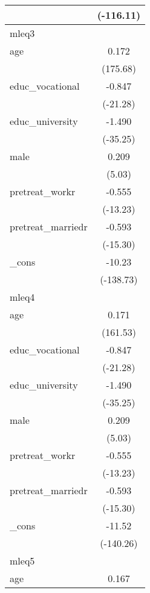 {\begin{tabular}{l*{1}{c}}
            &   (-116.11)         \\
\hline
mleq3       &                     \\
age         &       0.172\sym{***}\\
            &    (175.68)         \\
[1em]
educ\_vocational&      -0.847\sym{***}\\
            &    (-21.28)         \\
[1em]
educ\_university&      -1.490\sym{***}\\
            &    (-35.25)         \\
[1em]
male        &       0.209\sym{***}\\
            &      (5.03)         \\
[1em]
pretreat\_workr&      -0.555\sym{***}\\
            &    (-13.23)         \\
[1em]
pretreat\_marriedr&      -0.593\sym{***}\\
            &    (-15.30)         \\
[1em]
\_cons      &      -10.23\sym{***}\\
            &   (-138.73)         \\
\hline
mleq4       &                     \\
age         &       0.171\sym{***}\\
            &    (161.53)         \\
[1em]
educ\_vocational&      -0.847\sym{***}\\
            &    (-21.28)         \\
[1em]
educ\_university&      -1.490\sym{***}\\
            &    (-35.25)         \\
[1em]
male        &       0.209\sym{***}\\
            &      (5.03)         \\
[1em]
pretreat\_workr&      -0.555\sym{***}\\
            &    (-13.23)         \\
[1em]
pretreat\_marriedr&      -0.593\sym{***}\\
            &    (-15.30)         \\
[1em]
\_cons      &      -11.52\sym{***}\\
            &   (-140.26)         \\
\hline
mleq5       &                     \\
age         &       0.167\sym{***}\\

\end{tabular}}
